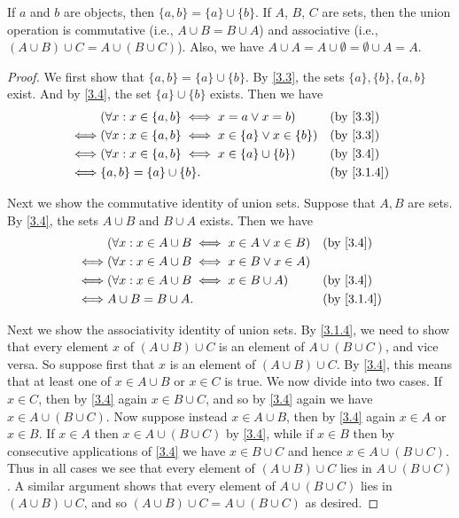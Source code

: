 \begin{lem}\label{3.1.13}
  If \(a\) and \(b\) are objects, then \(\{a, b\} = \{a\} \cup \{b\}\).
  If \(A\), \(B\), \(C\) are sets, then the union operation is commutative (i.e., \(A \cup B = B \cup A\)) and associative (i.e., \((A \cup B) \cup C = A \cup (B \cup C)\)).
  Also, we have \(A \cup A = A \cup \emptyset = \emptyset \cup A = A\).
\end{lem}

\begin{proof}
  We first show that \(\{a, b\} = \{a\} \cup \{b\}\).
  By \cref{3.3}, the sets \(\{a\}, \{b\}, \{a, b\}\) exist.
  And by \cref{3.4}, the set \(\{a\} \cup \{b\}\) exists.
  Then we have
  \begin{align*}
         & (\forall x : x \in \{a, b\} \iff x = a \lor x = b)             &  & \text{(by \cref{3.3})} \\
    \iff & (\forall x : x \in \{a, b\} \iff x \in \{a\} \lor x \in \{b\}) &  & \text{(by \cref{3.3})} \\
    \iff & (\forall x : x \in \{a, b\} \iff x \in \{a\} \cup \{b\})       &  & \text{(by \cref{3.4})} \\
    \iff & \{a, b\} = \{a\} \cup \{b\}.                                   &  & \by{3.1.4}
  \end{align*}

  Next we show the commutative identity of union sets.
  Suppose that \(A, B\) are sets.
  By \cref{3.4}, the sets \(A \cup B\) and \(B \cup A\) exists.
  Then we have
  \begin{align*}
         & (\forall x : x \in A \cup B \iff x \in A \lor x \in B) &  & \text{(by \cref{3.4})} \\
    \iff & (\forall x : x \in A \cup B \iff x \in B \lor x \in A)                             \\
    \iff & (\forall x : x \in A \cup B \iff x \in B \cup A)       &  & \text{(by \cref{3.4})} \\
    \iff & A \cup B = B \cup A.                                   &  & \by{3.1.4}
  \end{align*}

  Next we show the associativity identity of union sets.
  By \cref{3.1.4}, we need to show that every element \(x\) of \((A \cup B) \cup C\) is an element of \(A \cup (B \cup C)\), and vice versa.
  So suppose first that \(x\) is an element of \((A \cup B) \cup C\).
  By \cref{3.4}, this means that at least one of \(x \in A \cup B\) or \(x \in C\) is true.
  We now divide into two cases.
  If \(x \in C\), then by \cref{3.4} again \(x \in B \cup C\), and so by \cref{3.4} again we have \(x \in A \cup (B \cup C)\).
  Now suppose instead \(x \in A \cup B\), then by \cref{3.4} again \(x \in A\) or \(x \in B\).
  If \(x \in A\) then \(x \in A \cup (B \cup C)\) by \cref{3.4}, while if \(x \in B\) then by consecutive applications of \cref{3.4} we have \(x \in B \cup C\) and hence \(x \in A \cup (B \cup C)\).
  Thus in all cases we see that every element of \((A \cup B) \cup C\) lies in \(A \cup (B \cup C)\).
  A similar argument shows that every element of \(A \cup (B \cup C)\) lies in \((A \cup B) \cup C\), and so \((A \cup B) \cup C = A \cup (B \cup C) \) as desired.


\end{proof}
